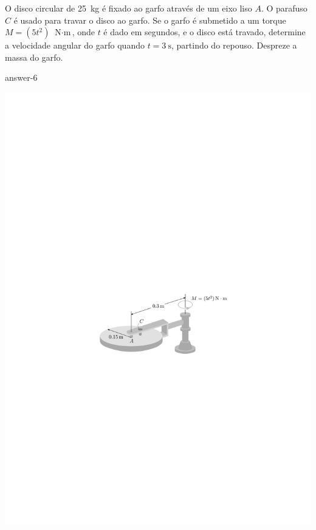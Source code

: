 \item O disco circular de \SI{25}{\kilogram} é fixado ao garfo através de um eixo liso $A$. O parafuso $C$ é usado para travar o disco ao garfo. Se o garfo é submetido a um torque $M=(5t^{2})\,\SI{}{\newton\cdot\meter}$, onde $t$ é dado em segundos, e o disco está travado, determine a velocidade angular do garfo quando $t=\SI{3}{\second}$, partindo do repouso. Despreze a massa do garfo.

{answer-6}

\vspace{-1cm}
\begin{flushright}
	\includegraphics[scale=1.25]{../../images/draw_4_1}
\end{flushright}
